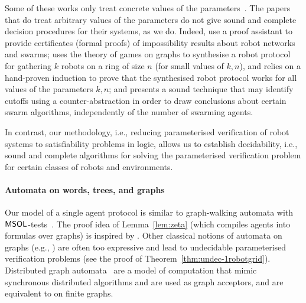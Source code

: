 Some of these works only treat concrete values of the parameters~\cite{HMM11,Bonnet12,Berard13}. 
% 
%
The papers that do treat arbitrary values of the parameters do not give sound and complete decision procedures for their systems, as we do. Indeed, \cite{ABCTU13,DBLP:journals/ipl/CourtieuRTU15,DBLP:conf/wdag/CourtieuRTU16} use a proof assistant to provide certificates (formal proofs) of impossibility results about robot networks and swarms; \cite{MPST14} uses the theory of games on graphs to synthesise a robot protocol for gathering $k$ robots on a ring of size $n$ (for small values of $k,n$), and relies on a hand-proven induction to prove that the synthesised robot protocol works for all values of the parameters $k,n$; and \cite{KoLo15} presents a sound technique that may identify cutoffs using a counter-abstraction in order to draw conclusions about certain swarm algorithms, independently of the number of swarming agents.


In contrast, our methodology, i.e., reducing parameterised verification of robot systems to satisfiability problems in logic, allows us to establish decidability, i.e., sound and complete algorithms for solving the parameterised verification problem for certain classes of robots and environments.




\paragraph{Automata on words, trees, and graphs}
Our model of a single agent protocol is similar to graph-walking automata with $\mathsf{MSOL}$-tests~\cite{BlEn97}. The proof idea of Lemma~\ref{lem:zeta} (which compiles agents into formulas over graphs) is inspired by \cite{BlEn97,EnHo06}. Other classical notions of automata on graphs (e.g., \cite{BlHe67}) are often too expressive and lead to undecidable parameterised verification problems (see the proof of Theorem~\ref{thm:undec-1robotgrid}). Distributed graph automata~\cite{DBLP:conf/lics/Reiter15} are a model of computation that mimic synchronous distributed algorithms and are used as graph acceptors, and are equivalent to \msol on finite graphs.

